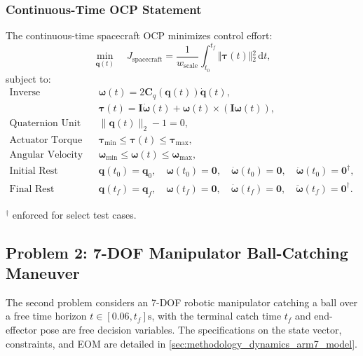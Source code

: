 \subsubsection{Continuous-Time OCP Statement}
The continuous-time spacecraft OCP minimizes control effort:
\begin{equation}
    \min_{\mathbf{q}(t)} \quad J_{\text{spacecraft}} = \frac{1}{w_{\text{scale}}} \int_{t_0}^{t_f} \Vert{}\boldsymbol{\tau}(t)\Vert{}_2^2 \, \mathrm{d}t,
    \label{eq:spacecraft_objective}
\end{equation}
subject to:
\begin{align}
    \text{Inverse Kinodynamics:} \quad & \boldsymbol{\omega}(t) = 2 \mathbf{C}_q(\mathbf{q}(t)) \dot{\mathbf{q}}(t), \\
                                       & \boldsymbol{\tau}(t) = \mathbf{I} \dot{\boldsymbol{\omega}}(t) + \boldsymbol{\omega}(t) \times \left( \mathbf{I} \boldsymbol{\omega}(t) \right), \\
    \text{Quaternion Unit Norm:} \quad & \|\mathbf{q}(t)\|_2 - 1 = 0,  \label{eq:sc_norm_constr} \\
    \text{Actuator Torque Limits:} \quad & \boldsymbol{\tau}_{\min} \le \boldsymbol{\tau}(t) \le \boldsymbol{\tau}_{\max}, \label{eq:sc_tau_bounds} \\
    \text{Angular Velocity Limits:} \quad & \boldsymbol{\omega}_{\min} \le \boldsymbol{\omega}(t) \le \boldsymbol{\omega}_{\max}, \label{eq:sc_omega_bounds} \\
    \text{Initial Rest Boundary:} \quad & \mathbf{q}(t_0) = \mathbf{q}_0, \quad \boldsymbol{\omega}(t_0) = \mathbf{0}, \quad \dot{\boldsymbol{\omega}}(t_0) = \mathbf{0}, \quad \ddot{\boldsymbol{\omega}}(t_0) = \mathbf{0}^\dagger, \label{eq:sc_bc_start} \\
    \text{Final Rest Boundary:} \quad & \mathbf{q}(t_f) = \mathbf{q}_f, \quad \boldsymbol{\omega}(t_f) = \mathbf{0}, \quad \dot{\boldsymbol{\omega}}(t_f) = \mathbf{0}, \quad \ddot{\boldsymbol{\omega}}(t_f) = \mathbf{0}^\dagger. \label{eq:sc_bc_end}
\end{align}

${}^\dagger$ enforced for select test cases.

\subsection{Problem 2: 7-DOF Manipulator Ball-Catching Maneuver}
\label{sec:ocp_arm7}

The second problem considers an 7-\ac{DOF} robotic manipulator catching a ball over a free time horizon $t \in [0.06, t_f] \text{s}$, with the terminal catch time $t_f$ and end-effector pose are free decision variables.
The specifications on the state vector, constraints, and \ac{EOM} are detailed in \cref{sec:methodology_dynamics_arm7_model}.

